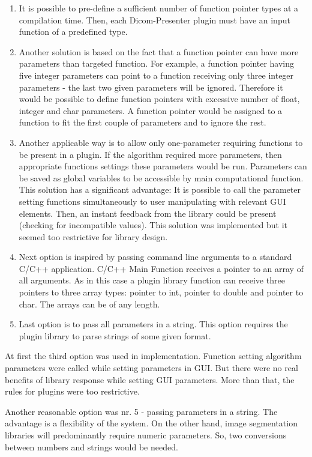 \begin{enumerate}
\item It is possible to pre-define a sufficient number of function pointer types at a compilation time. Then, each Dicom-Presenter plugin must have an input function of a predefined type.
\item Another solution is based on the fact that a function pointer can have more parameters than targeted function. For example, a function pointer having five integer parameters can point to a function receiving only three integer parameters - the last two given parameters will be ignored. Therefore it would be possible to define function pointers with excessive number of float, integer and char parameters. A function pointer would be assigned to a function to fit the first couple of parameters and to ignore the rest.
\item Another applicable way is to allow only one-parameter requiring functions to be present in a plugin. If the algorithm required more parameters, then appropriate functions settings these parameters would be run. Parameters can be saved as global variables to be accessible by main computational function. This solution has a significant advantage: It is possible to call the parameter setting functions simultaneously to user manipulating with relevant GUI elements. Then, an instant feedback from the library could be present (checking for incompatible values). This solution was implemented but it seemed too restrictive for library design. 
\item Next option is inspired by passing command line arguments to a standard C/C++ application. C/C++ Main Function receives a pointer to an array of all arguments. As in this case a plugin library function can receive three pointers to three array types: pointer to int, pointer to double and pointer to char. The arrays can be of any length.
\item Last option is to pass all parameters in a string. This option requires the plugin library to parse strings of some given format. 
\end{enumerate}

At first the third option was used in implementation. Function setting algorithm parameters were called while setting parameters in GUI. But there were no real benefits of library response while setting GUI parameters. More than that, the rules for plugins were too restrictive. 

Another reasonable option was nr. 5 - passing parameters in a string. The advantage is a flexibility of the system. On the other hand, image segmentation libraries will predominantly require numeric parameters. So, two conversions between numbers and strings would be needed.

